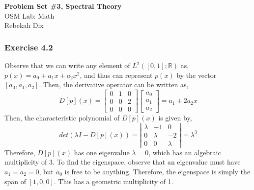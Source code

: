 \documentclass[letterpaper,12pt]{article}
\theoremstyle{definition}
\begin{document}
\begin{flushleft}
  \textbf{\large{Problem Set \#3, Spectral Theory}} \\
  OSM Lab: Math \\
  Rebekah Dix
\end{flushleft}

\vspace{5mm}

\subsubsection*{Exercise 4.2}
Observe that we can write any element of $L^2([0,1]; \mathbb{R})$ as,$p(x) = a_0 + a_1 x + a_2 x^2$, and thus can represent $p(x)$ by the vector $[a_0, a_1, a_2]$. Then, the derivative operator can be written as,
\begin{equation}
	D[p](x) = 
	\begin{bmatrix}
	0 & 1 & 0 \\
	0 & 0 & 2 \\
	0 & 0 & 0 
	\end{bmatrix}
	\begin{bmatrix}
	a_0 \\ a_1 \\ a_2
	\end{bmatrix}
	= a_1 + 2a_2 x
\end{equation}
Then, the characteristic polynomial of $D[p](x)$ is given by,
\begin{equation}
	det(\lambda I - D[p](x)) = 
	\left|
	\begin{matrix}
	\lambda & -1 & 0 \\
	0 & \lambda & -2 \\
	0 & 0 & \lambda
	\end{matrix}
	\right|
	= \lambda^3
\end{equation}
Therefore, $D[p](x)$ has one eigenvalue $\lambda = 0$, which has an algebraic multiplicity of 3. To find the eigenspace, observe that an eigenvalue must have $a_1 = a_2 = 0$, but $a_0$ is free to be anything. Therefore, the eigenspace is simply the span of $[1, 0, 0]$. This has a geometric multiplicity of 1. 
\end{document}
